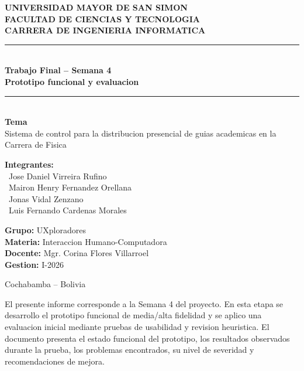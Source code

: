 \documentclass[12pt,letterpaper]{article}
\begin{document}
\begin{titlepage}
    \centering

    {\large \textbf{UNIVERSIDAD MAYOR DE SAN SIMON}}\\
    {\large \textbf{FACULTAD DE CIENCIAS Y TECNOLOGIA}}\\
    {\large \textbf{CARRERA DE INGENIERIA INFORMATICA}}\\[0.5cm]

    \rule{\textwidth}{0.5pt}\\[0.5cm]
    {\Large \textbf{Trabajo Final -- Semana 4}}\\[0.3cm]
    {\large \textbf{Prototipo funcional y evaluacion}}\\[0.5cm]
    \rule{\textwidth}{0.5pt}\\[1cm]

    {\large \textbf{Tema}}\\[0.3cm]
    {\large Sistema de control para la distribucion presencial de guias academicas en la Carrera de Fisica}\\[2cm]

    \begin{flushleft}
        \textbf{Integrantes:}\\
        \hspace*{0.5cm}\textbullet\ Jose Daniel Virreira Rufino\\
        \hspace*{0.5cm}\textbullet\ Mairon Henry Fernandez Orellana\\
        \hspace*{0.5cm}\textbullet\ Jonas Vidal Zenzano\\
        \hspace*{0.5cm}\textbullet\ Luis Fernando Cardenas Morales
    \end{flushleft}

    \begin{flushleft}
        \textbf{Grupo:} UXploradores\\
        \textbf{Materia:} Interaccion Humano-Computadora\\
        \textbf{Docente:} Mgr. Corina Flores Villarroel\\
        \textbf{Gestion:} I-2026
    \end{flushleft}

    \vfill

    {\small Cochabamba -- Bolivia}\\
\end{titlepage}

El presente informe corresponde a la Semana 4 del proyecto. En esta etapa se desarrollo el prototipo funcional de media/alta fidelidad y se aplico una evaluacion inicial mediante pruebas de usabilidad y revision heuristica. El documento presenta el estado funcional del prototipo, los resultados observados durante la prueba, los problemas encontrados, su nivel de severidad y recomendaciones de mejora.
\end{document}
